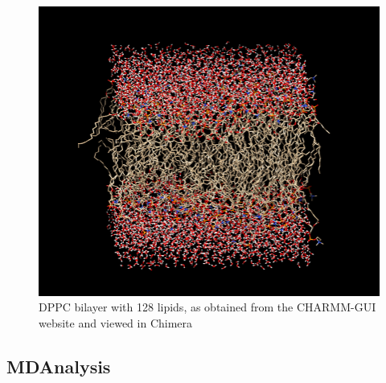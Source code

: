 \documentclass[12pt, a4paper]{report}
\begin{document}
\begin{figure}[h]
    \includegraphics[scale=0.65]{images/dppc 128.png} 
    \centering 
    \caption{DPPC bilayer with 128 lipids, as obtained from the CHARMM-GUI website and viewed in Chimera}
    \centering
\end{figure} 



\clearpage

\subsection*{MDAnalysis} 
\end{document}
